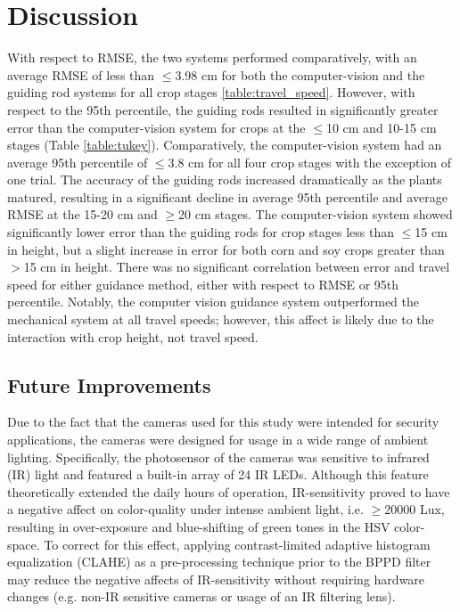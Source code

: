 \documentclass[authoryear]{elsarticle}
\begin{document}
\section{Discussion}
With respect to RMSE, the two systems performed comparatively, with an
average RMSE of less than $\le$3.98 cm for both the computer-vision and the
guiding rod systems for all crop stages
\ref{table:travel_speed}. However, with respect to the 95th
percentile, the guiding rods resulted in significantly greater error than the
computer-vision system for crops at the $\le$10 cm and 10-15 cm stages
(Table \ref{table:tukey}). Comparatively, the computer-vision system
had an average 95th percentile of $\le$3.8 cm for all four crop stages
with the exception of one trial. The accuracy of the guiding rods
increased dramatically as the plants matured, resulting in a
significant decline in average 95th percentile and average RMSE at the
15-20 cm and $\ge$20 cm stages. The computer-vision system showed
significantly lower error than the guiding rods for crop stages less
than $\le$15 cm in height, but a slight increase in error for both
corn and soy crops greater than $>$15 cm in height. There was no
significant correlation between error and travel speed for either guidance method,
either with respect to RMSE or 95th percentile. Notably, the computer
vision guidance system outperformed the mechanical system at all
travel speeds; however, this affect is likely due to the interaction
with crop height, not travel speed.

\subsection{Future Improvements}
Due to the fact that the cameras used for this study were intended for
security applications, the cameras were designed for usage in a wide
range of ambient lighting. Specifically, the photosensor of the
cameras was sensitive to infrared (IR) light and featured a built-in
array of 24 IR LEDs. Although this feature theoretically extended the
daily hours of operation, IR-sensitivity proved to have a negative
affect on color-quality under intense ambient light, i.e. $\ge$20000
Lux, resulting in over-exposure and blue-shifting of green tones in
the HSV color-space. To correct for this effect, applying
contrast-limited adaptive histogram equalization (CLAHE) as a
pre-processing technique prior to the BPPD filter may reduce the
negative affects of IR-sensitivity without requiring hardware changes
(e.g. non-IR sensitive cameras or usage of an IR filtering lens).
\end{document}
